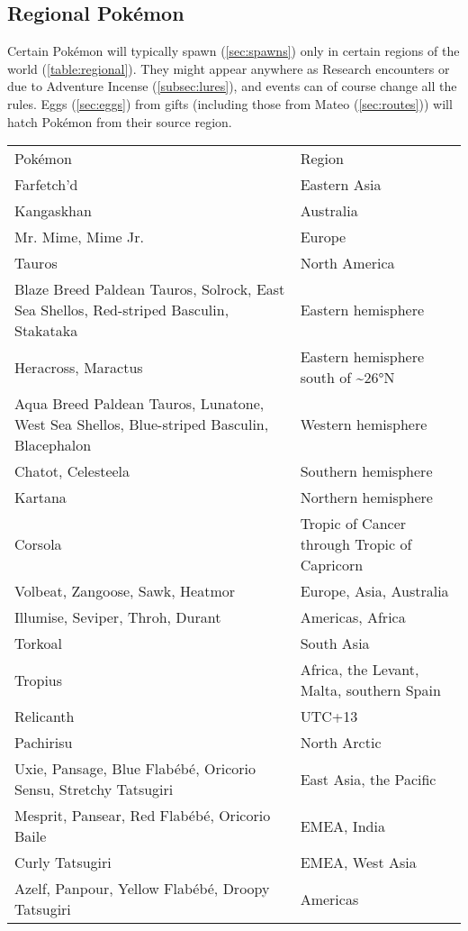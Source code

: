 \subsection{Regional Pokémon\label{subsec:regional}}
Certain Pokémon will typically spawn (\autoref{sec:spawns}) only in certain regions of the world (\autoref{table:regional}).
They might appear anywhere as Research encounters or due to Adventure Incense (\autoref{subsec:lures}),
 and events can of course change all the rules.
Eggs (\autoref{sec:eggs}) from gifts (including those from Mateo (\autoref{sec:routes})) will
 hatch Pokémon from their source region.
\begin{table}
\centering
\footnotesize
  \begin{tabular}{p{}l}
Pokémon & Region \\
\Midrule
Farfetch'd & Eastern Asia\\
Kangaskhan & Australia\\
Mr. Mime, Mime Jr. & Europe\\
Tauros & North America\\
Blaze Breed Paldean Tauros, Solrock, East Sea Shellos, Red-striped Basculin, Stakataka & Eastern hemisphere\\
Heracross, Maractus & Eastern hemisphere south of \textasciitilde\ang{26}N\\
Aqua Breed Paldean Tauros, Lunatone, West Sea Shellos, Blue-striped Basculin, Blacephalon & Western hemisphere\\
Chatot, Celesteela & Southern hemisphere\\
Kartana & Northern hemisphere\\
Corsola & Tropic of Cancer through Tropic of Capricorn\\
Volbeat, Zangoose, Sawk, Heatmor & Europe, Asia, Australia\\
Illumise, Seviper, Throh, Durant & Americas, Africa\\
Torkoal & South Asia\\
Tropius & Africa, the Levant, Malta, southern Spain\\
Relicanth & UTC+13\\
Pachirisu & North Arctic\\
Uxie, Pansage, Blue Flabébé, Oricorio Sensu, Stretchy Tatsugiri & East Asia, the Pacific\\
Mesprit, Pansear, Red Flabébé, Oricorio Baile & EMEA, India\\
Curly Tatsugiri & EMEA, West Asia\\
Azelf, Panpour, Yellow Flabébé, Droopy Tatsugiri & Americas\\

\end{tabular}
\end{table}
